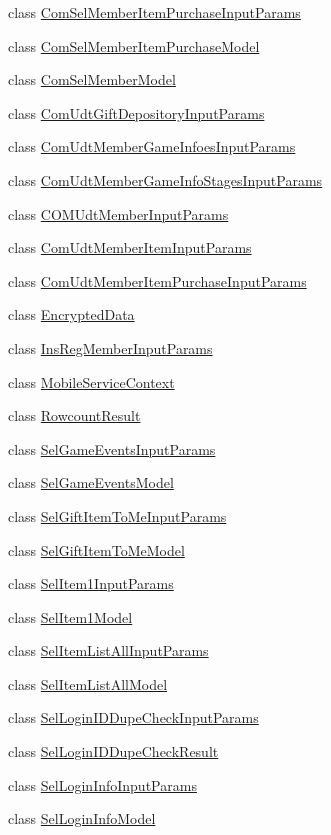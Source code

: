 \begin{DoxyCompactItemize}
class \hyperlink{a00065}{Com\+Sel\+Member\+Item\+Purchase\+Input\+Params}
\item 
class \hyperlink{a00066}{Com\+Sel\+Member\+Item\+Purchase\+Model}
\item 
class \hyperlink{a00067}{Com\+Sel\+Member\+Model}
\item 
class \hyperlink{a00068}{Com\+Udt\+Gift\+Depository\+Input\+Params}
\item 
class \hyperlink{a00069}{Com\+Udt\+Member\+Game\+Infoes\+Input\+Params}
\item 
class \hyperlink{a00070}{Com\+Udt\+Member\+Game\+Info\+Stages\+Input\+Params}
\item 
class \hyperlink{a00071}{C\+O\+M\+Udt\+Member\+Input\+Params}
\item 
class \hyperlink{a00072}{Com\+Udt\+Member\+Item\+Input\+Params}
\item 
class \hyperlink{a00073}{Com\+Udt\+Member\+Item\+Purchase\+Input\+Params}
\item 
class \hyperlink{a00074}{Encrypted\+Data}
\item 
class \hyperlink{a00077}{Ins\+Reg\+Member\+Input\+Params}
\item 
class \hyperlink{a00080}{Mobile\+Service\+Context}
\item 
class \hyperlink{a00085}{Rowcount\+Result}
\item 
class \hyperlink{a00086}{Sel\+Game\+Events\+Input\+Params}
\item 
class \hyperlink{a00087}{Sel\+Game\+Events\+Model}
\item 
class \hyperlink{a00088}{Sel\+Gift\+Item\+To\+Me\+Input\+Params}
\item 
class \hyperlink{a00089}{Sel\+Gift\+Item\+To\+Me\+Model}
\item 
class \hyperlink{a00090}{Sel\+Item1\+Input\+Params}
\item 
class \hyperlink{a00091}{Sel\+Item1\+Model}
\item 
class \hyperlink{a00092}{Sel\+Item\+List\+All\+Input\+Params}
\item 
class \hyperlink{a00093}{Sel\+Item\+List\+All\+Model}
\item 
class \hyperlink{a00094}{Sel\+Login\+I\+D\+Dupe\+Check\+Input\+Params}
\item 
class \hyperlink{a00095}{Sel\+Login\+I\+D\+Dupe\+Check\+Result}
\item 
class \hyperlink{a00096}{Sel\+Login\+Info\+Input\+Params}
\item 
class \hyperlink{a00097}{Sel\+Login\+Info\+Model}

\end{DoxyCompactItemize}
